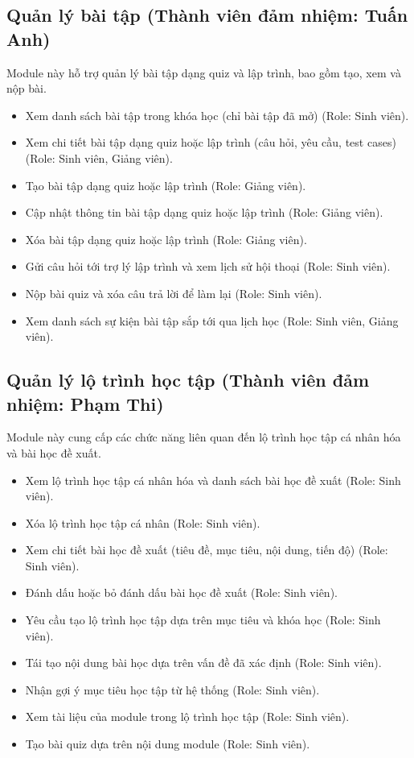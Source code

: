 \subsection{Quản lý bài tập (Thành viên đảm nhiệm: Tuấn Anh)}
Module này hỗ trợ quản lý bài tập dạng quiz và lập trình, bao gồm tạo, xem và nộp bài.
\begin{itemize}[label=--]
    \item Xem danh sách bài tập trong khóa học (chỉ bài tập đã mở) (Role: Sinh viên).
    \item Xem chi tiết bài tập dạng quiz hoặc lập trình (câu hỏi, yêu cầu, test cases) (Role: Sinh viên, Giảng viên).
    \item Tạo bài tập dạng quiz hoặc lập trình (Role: Giảng viên).
    \item Cập nhật thông tin bài tập dạng quiz hoặc lập trình (Role: Giảng viên).
    \item Xóa bài tập dạng quiz hoặc lập trình (Role: Giảng viên).
    \item Gửi câu hỏi tới trợ lý lập trình và xem lịch sử hội thoại (Role: Sinh viên).
    \item Nộp bài quiz và xóa câu trả lời để làm lại (Role: Sinh viên).
    \item Xem danh sách sự kiện bài tập sắp tới qua lịch học (Role: Sinh viên, Giảng viên).
\end{itemize}

\subsection{Quản lý lộ trình học tập (Thành viên đảm nhiệm: Phạm Thi)}
Module này cung cấp các chức năng liên quan đến lộ trình học tập cá nhân hóa và bài học đề xuất.
\begin{itemize}[label=--]
    \item Xem lộ trình học tập cá nhân hóa và danh sách bài học đề xuất (Role: Sinh viên).
    \item Xóa lộ trình học tập cá nhân (Role: Sinh viên).
    \item Xem chi tiết bài học đề xuất (tiêu đề, mục tiêu, nội dung, tiến độ) (Role: Sinh viên).
    \item Đánh dấu hoặc bỏ đánh dấu bài học đề xuất (Role: Sinh viên).
    \item Yêu cầu tạo lộ trình học tập dựa trên mục tiêu và khóa học (Role: Sinh viên).
    \item Tái tạo nội dung bài học dựa trên vấn đề đã xác định (Role: Sinh viên).
    \item Nhận gợi ý mục tiêu học tập từ hệ thống (Role: Sinh viên).
    \item Xem tài liệu của module trong lộ trình học tập (Role: Sinh viên).
    \item Tạo bài quiz dựa trên nội dung module (Role: Sinh viên).
\end{itemize}

